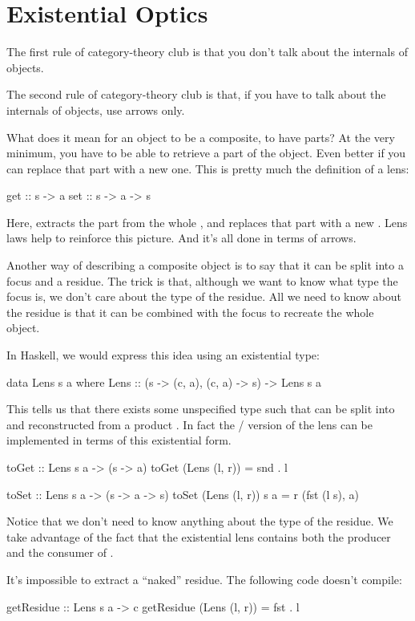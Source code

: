 \documentclass[DaoFP]{subfiles}
\begin{document}
\section{Existential Optics}

The first rule of category-theory club is that you don't talk about the internals of objects.

The second rule of category-theory club is that, if you have to talk about the internals of objects, use arrows only.

What does it mean for an object to be a composite, to have parts? At the very minimum, you have to be able to retrieve a part of the object. Even better if you can replace that part with a new one. This is pretty much the definition of a lens:
\begin{haskell}
get :: s -> a
set :: s -> a -> s
\end{haskell}
Here,  extracts the part  from the whole , and  replaces that part with a new . Lens laws help to reinforce this picture. And it's all done in terms of arrows. 

Another way of describing a composite object is to say that it can be split into a focus and a residue. The trick is that, although we want to know what type the focus is, we don't care about the type of the residue. All we need to know about the residue is that it can be combined with the focus to recreate the whole object. 

In Haskell, we would express this idea using an existential type:
\begin{haskell}
data Lens s a where
    Lens :: (s -> (c, a), (c, a) -> s) -> Lens s a
\end{haskell}
This tells us that there exists some unspecified type  such that  can be split into and reconstructed from a product . In fact the / version of the lens can be implemented in terms of this existential form.
\begin{haskell}
toGet :: Lens s a -> (s -> a)
toGet (Lens (l, r)) = snd . l

toSet :: Lens s a -> (s -> a -> s)
toSet (Lens (l, r)) s a = r (fst (l s), a)
\end{haskell}

Notice that we don't need to know anything about the type of the residue. We take advantage of the fact that the existential lens contains both the producer and the consumer of .

It's impossible to extract a ``naked'' residue. The following code doesn't compile:
\begin{haskell}
getResidue :: Lens s a -> c
getResidue (Lens (l, r)) = fst . l
\end{haskell}
\end{document}
